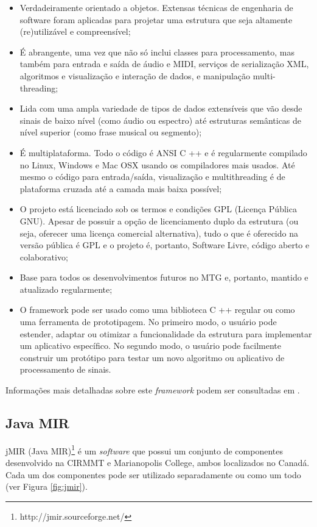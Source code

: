 \begin{itemize}
    \item Verdadeiramente orientado a objetos. Extensas técnicas de engenharia de software foram aplicadas para projetar uma estrutura que seja altamente (re)utilizável e compreensível;
    \item É abrangente, uma vez que não só inclui classes para processamento, mas também para entrada e saída de áudio e MIDI, serviços de serialização XML, algoritmos e visualização e interação de dados, e manipulação multi-threading;
    \item Lida com uma ampla variedade de tipos de dados extensíveis que vão desde sinais de baixo nível (como áudio ou espectro) até estruturas semânticas de nível superior (como frase musical ou segmento);
    \item É multiplataforma. Todo o código é ANSI C ++ e é regularmente compilado no Linux, Windows e Mac OSX usando os compiladores mais usados. Até mesmo o código para entrada/saída, visualização e multithreading é de plataforma cruzada até a camada mais baixa possível;
    \item O projeto está licenciado sob os termos e condições GPL (Licença Pública GNU). Apesar de possuir a opção de licenciamento duplo da estrutura (ou seja, oferecer uma licença comercial alternativa), tudo o que é oferecido na versão pública é GPL e o projeto é, portanto, Software Livre, código aberto e colaborativo;
    \item Base para todos os desenvolvimentos futuros no MTG e, portanto, mantido e atualizado regularmente;
    \item O framework pode ser usado como uma biblioteca C ++ regular ou como uma ferramenta de prototipagem. No primeiro modo, o usuário pode estender, adaptar ou otimizar a funcionalidade da estrutura para implementar um aplicativo específico. No segundo modo, o usuário pode facilmente construir um protótipo para testar um novo algoritmo ou aplicativo de processamento de sinais.
\end{itemize}

Informações mais detalhadas sobre este \textit{framework} podem ser consultadas em \cite{amatriain2007, amatriain2004}.


\subsection{Java MIR} \label{subsec:jmir}
jMIR (Java MIR)\footnote{http://jmir.sourceforge.net/} é um \textit{software} que possui um conjunto de componentes desenvolvido na CIRMMT e Marianopolis College, ambos localizados no Canadá. Cada um dos componentes pode ser utilizado separadamente ou como um todo (ver Figura \ref{fig:jmir}).

